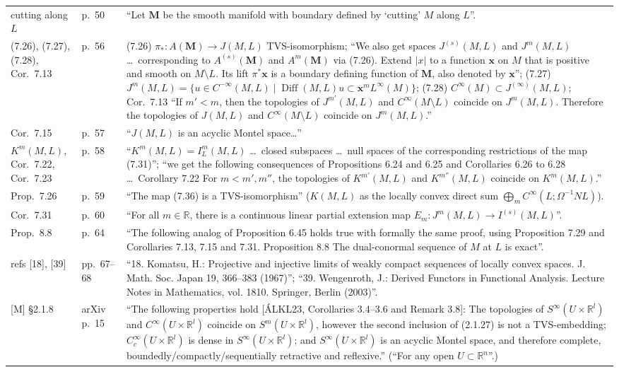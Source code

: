 \documentclass[11pt]{article}
\newcommand{\R}{\mathbb{R}}
\newcommand{\Diff}{\operatorname{Diff}}
\newcommand{\MB}{\boldsymbol M}
\newcommand{\xb}{\boldsymbol x}
\begin{document}
{\begin{longtable}{@{}p{}p{}p{}@{}}
cutting along $L$ & p.~50 & ``Let $\MB$ be the smooth manifold with boundary defined by `cutting' $M$ along $L$''.\\
(7.26), (7.27), (7.28), Cor.~7.13 & p.~56 & (7.26) $\pi_*\colon A(\MB)\to J(M,L)$ TVS-isomorphism; ``We also get spaces $J^{(s)}(M,L)$ and $J^m(M,L)$ \dots\ corresponding to $A^{(s)}(\MB)$ and $A^m(\MB)$ via (7.26). Extend $|x|$ to a function $\xb$ on $M$ that is positive and smooth on $M\setminus L$. Its lift $\pi^*\xb$ is a boundary defining function of $\MB$, also denoted by $\xb$''; (7.27) $J^m(M,L)=\{u\in C^{-\infty}(M,L)\mid\Diff(M,L)u\subset\xb^mL^\infty(M)\}$; (7.28) $C^\infty(M)\subset J^{(\infty)}(M,L)$; Cor.~7.13 ``If $m'<m$, then the topologies of $J^{m'}(M,L)$ and $C^\infty(M\setminus L)$ coincide on $J^m(M,L)$. Therefore the topologies of $J(M,L)$ and $C^\infty(M\setminus L)$ coincide on $J^m(M,L)$.''\\
Cor.~7.15 & p.~57 & ``$J(M,L)$ is an acyclic Montel space\dots''\\
$K^m(M,L)$, Cor.~7.22, Cor.~7.23 & p.~58 & ``$K^m(M,L)=I^m_L(M,L)$ \dots\ closed subspaces \dots\ null spaces of the corresponding restrictions of the map (7.31)''; ``we get the following consequences of Propositions 6.24 and 6.25 and Corollaries 6.26 to 6.28 \dots\ Corollary 7.22 For $m<m',m''$, the topologies of $K^{m'}(M,L)$ and $K^{m''}(M,L)$ coincide on $K^m(M,L)$.''\\
Prop.~7.26 & p.~59 & ``The map (7.36) is a TVS-isomorphism'' ($K(M,L)$ as the locally convex direct sum $\bigoplus_mC^\infty(L;\Omega^{-1}NL)$).\\
Cor.~7.31 & p.~60 & ``For all $m\in\R$, there is a continuous linear partial extension map $E_m\colon J^m(M,L)\to I^{(s)}(M,L)$''.\\
Prop.~8.8 & p.~64 & ``The following analog of Proposition 6.45 holds true with formally the same proof, using Proposition 7.29 and Corollaries 7.13, 7.15 and 7.31. Proposition 8.8 The dual-conormal sequence of $M$ at $L$ is exact''.\\
refs [18], [39] & pp.~67--68 & ``18. Komatsu, H.: Projective and injective limits of weakly compact sequences of locally convex spaces. J. Math. Soc. Japan 19, 366--383 (1967)''; ``39. Wengenroth, J.: Derived Functors in Functional Analysis. Lecture Notes in Mathematics, vol. 1810. Springer, Berlin (2003)''.\\
{[M]} \S2.1.8 & arXiv p.~15 & ``The following properties hold [\'ALKL23, Corollaries 3.4--3.6 and Remark 3.8]: The topologies of $S^\infty(U\times\R^l)$ and $C^\infty(U\times\R^l)$ coincide on $S^m(U\times\R^l)$, however the second inclusion of (2.1.27) is not a TVS-embedding; $C_c^\infty(U\times\R^l)$ is dense in $S^\infty(U\times\R^l)$; and $S^\infty(U\times\R^l)$ is an acyclic Montel space, and therefore complete, boundedly/compactly/sequentially retractive and reflexive.'' (``For any open $U\subset\R^n$''.)\\

\end{longtable}}
\end{document}
